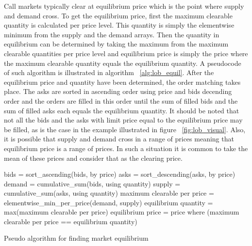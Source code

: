 Call markets typically clear at equilibrium price which is the point where
supply and demand cross. To get the equilibrium price, first the maximum clearable quantity
is calculated per price level. This quantity is simply the elementwise
minimum from the supply and the demand arrays. Then the quantity in equilibrium
can be determined by taking the maximum from the maximum clearable quantities
per price level and equilibrium price is simply the price where the maximum clearable quantity
equals the equilibrium quantity. A pseudocode of such algorithm is illustrated in 
algorithm ~\ref{alg:lob_equil}. After the equilibrium price and quantity have been determined, the 
order matching takes place. The asks are sorted in ascending order using price and bids decending order
and the orders are filled in this order until the sum of filled bids and the sum of filled asks
each equals the equilibrium quantity. It should be noted that not all the bids and the asks with limit price 
equal to the equilibrium price may be filled, as is the case in the example illustrated in figure ~\ref{fig:lob_visual}. 
Also, it is possible that supply and demand cross in a range of prices meaning that equilibrium price is 
a range of prices. In such a situation it is common to take the mean of these prices and consider that 
as the clearing price.


\begin{algorithm}[H]
    \SetAlgoLined
    \DontPrintSemicolon
    
    bids = sort\_ascending(bids, by price)\;
    asks = sort\_descending(asks, by price)\;
    \;
    demand = cumulative\_sum(bids, using quantity)\;
    supply = cumulative\_sum(asks, using quantity)\;
    \;
    maximum clearable per price = elementwise\_min\_per\_price(demand, supply)\;
    \;
    equilibrium quantity = max(maximum clearable per price)\;
    equilibrium price = price where (maximum clearable per price == equilibrium quantity)\;
    \caption{Pseudo algorithm for finding market equilibrium}
    \label{alg:lob_equil}
\end{algorithm}

